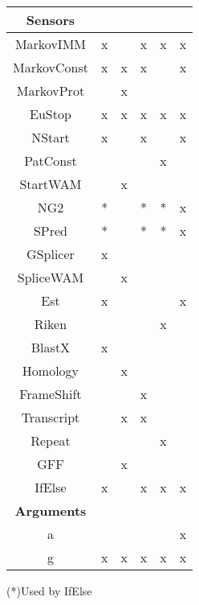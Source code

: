 \documentclass[a4paper,11pt]{article}
\begin{document}
\begin{center}
\begin{tabular}{|c|c|c|c|c|c|}
{\bf Sensors}& & & & \\ \hline \hline
MarkovIMM      &       x        &         &       x     &      x         &  x   \\ \hline
MarkovConst    &       x        &     x   &       x     &                &  x   \\ \hline
MarkovProt     &                &     x   &             &                &      \\ \hline
EuStop         &       x        &     x   &       x     &      x         &  x   \\ \hline
NStart         &       x        &         &       x     &                &  x   \\ \hline
PatConst       &                &         &             &      x         &      \\ \hline
StartWAM       &                &     x   &             &                &      \\ \hline
NG2            & *              &         & *           & *              &  x   \\  \hline
SPred          & *              &         & *           & *              &  x   \\  \hline
GSplicer       &       x        &         &             &                &      \\ \hline
SpliceWAM      &                &     x   &             &                &      \\ \hline
Est            &       x        &         &             &                &  x   \\  \hline
Riken          &                &         &             &      x         &      \\ \hline
BlastX         &       x        &         &             &                &      \\  \hline
Homology       &                &     x   &             &                &      \\ \hline
FrameShift     &                &         &      x      &                &      \\ \hline
Transcript     &                &     x   &      x      &                &      \\ \hline
Repeat         &                &         &             &      x         &      \\ \hline
GFF            &                &     x   &             &                &      \\ \hline
IfElse         &       x        &         &      x      &      x         & x    \\ \hline \hline

{\bf Arguments}& & & & & \\ \hline \hline
a              &                &         &             &                & x    \\ \hline 
g              &       x        &     x   &      x      &      x         & x    \\ \hline
\end{tabular}
\end{center}
(*)Used by IfElse
\vspace{0.5cm}
\end{document}
